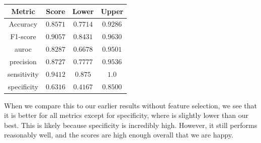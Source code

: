 \documentclass[11pt]{article}
\begin{document}
\begin{enumerate}
\begin{tabular}{| c | c | c | c |}
\hline
Metric & Score & Lower & Upper \\
\hline
Accuracy & $0.8571$ & $0.7714$ & $0.9286$ \\
F1-score & $0.9057$ & $0.8431$ & $0.9630$ \\
auroc & $0.8287$ & $0.6678$ & $0.9501$ \\
precision & $0.8727$ & $0.7777$ & $0.9536$ \\
sensitivity & $0.9412$ & $0.875$ & $1.0$ \\
specificity & $0.6316$ & $0.4167$ & $0.8500$ \\
\hline
\end{tabular}

When we compare this to our earlier results without feature selection, we see that it is better for all metrics
except for specificity, where is slightly lower than our best. This is likely because specificity is incredibly high. However, it still performs reasonably well, and the scores are high enough overall that we are happy. 

\end{enumerate}
\end{document}

